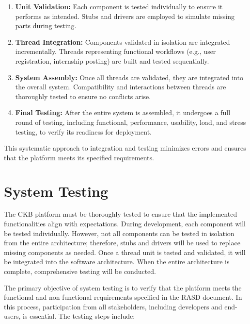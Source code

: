\begin{enumerate}
    \item \textbf{Unit Validation:} Each component is tested individually to ensure it performs as intended. Stubs and drivers are employed to simulate missing parts during testing.
    \item \textbf{Thread Integration:} Components validated in isolation are integrated incrementally. Threads representing functional workflows (e.g., user registration, internship posting) are built and tested sequentially.
    \item \textbf{System Assembly:} Once all threads are validated, they are integrated into the overall system. Compatibility and interactions between threads are thoroughly tested to ensure no conflicts arise.
    \item \textbf{Final Testing:} After the entire system is assembled, it undergoes a full round of testing, including functional, performance, usability, load, and stress testing, to verify its readiness for deployment.
\end{enumerate}

This systematic approach to integration and testing minimizes errors and ensures that the platform meets its specified requirements.

\section{System Testing\label{sec:system_testing}}

The CKB platform must be thoroughly tested to ensure that the implemented functionalities align with expectations. During development, each component will be tested individually. However, not all components can be tested in isolation from the entire architecture; therefore, stubs and drivers will be used to replace missing components as needed. Once a thread unit is tested and validated, it will be integrated into the software architecture. When the entire architecture is complete, comprehensive testing will be conducted.

The primary objective of system testing is to verify that the platform meets the functional and non-functional requirements specified in the RASD document. In this process, participation from all stakeholders, including developers and end-users, is essential. The testing steps include:

